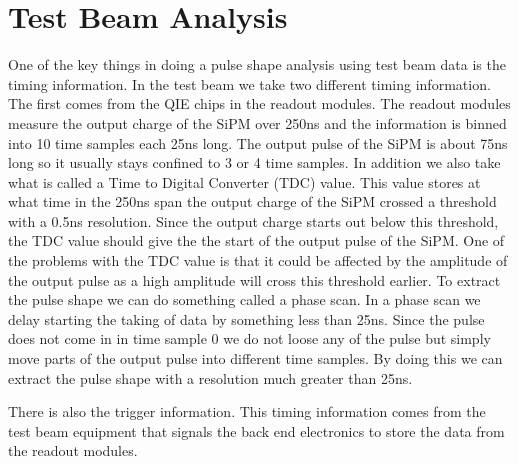 \section{Test Beam Analysis}

One of the key things in doing a pulse shape analysis using test beam data is the timing information. In the test beam we take two different timing information. The first comes from the QIE chips in the readout modules. The readout modules measure the output charge of the SiPM over 250ns and the information is binned into 10 time samples each 25ns long. The output pulse of the SiPM is about 75ns long so it usually stays confined to 3 or 4 time samples. In addition we also take what is called a Time to Digital Converter (TDC) value. This value stores at what time in the 250ns span the output charge of the SiPM crossed a threshold with a 0.5ns resolution. Since the output charge starts out below this threshold, the TDC value should give the the start of the output pulse of the SiPM. One of the problems with the TDC value is that it could be affected by the amplitude of the output pulse as a high amplitude will cross this threshold earlier. To extract the pulse shape we can do something called a phase scan. In a phase scan we delay starting the taking of data by something less than 25ns. Since the pulse does not come in in time sample 0 we do not loose any of the pulse but simply move parts of the output pulse into different time samples. By doing this we can extract the pulse shape with a resolution much greater than 25ns. 

There is also the trigger information. This timing information comes from the test beam equipment that signals the back end electronics to store the data from the readout modules. 
